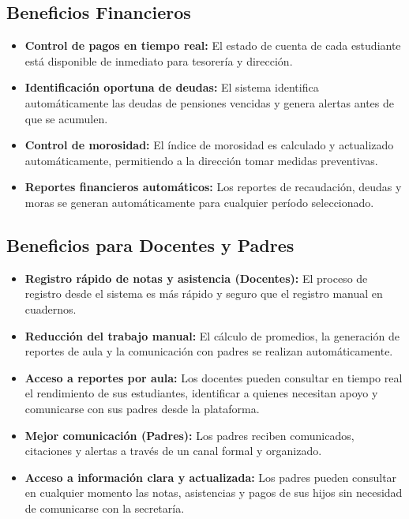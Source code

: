 \documentclass[12pt,a4paper,oneside]{report}
\begin{document}
\subsection{Beneficios Financieros}
\begin{itemize}
  \item \textbf{Control de pagos en tiempo real:} El estado de cuenta de cada estudiante está disponible de inmediato para tesorería y dirección.
  \item \textbf{Identificación oportuna de deudas:} El sistema identifica automáticamente las deudas de pensiones vencidas y genera alertas antes de que se acumulen.
  \item \textbf{Control de morosidad:} El índice de morosidad es calculado y actualizado automáticamente, permitiendo a la dirección tomar medidas preventivas.
  \item \textbf{Reportes financieros automáticos:} Los reportes de recaudación, deudas y moras se generan automáticamente para cualquier período seleccionado.
\end{itemize}

\subsection{Beneficios para Docentes y Padres}
\begin{itemize}
  \item \textbf{Registro rápido de notas y asistencia (Docentes):} El proceso de registro desde el sistema es más rápido y seguro que el registro manual en cuadernos.
  \item \textbf{Reducción del trabajo manual:} El cálculo de promedios, la generación de reportes de aula y la comunicación con padres se realizan automáticamente.
  \item \textbf{Acceso a reportes por aula:} Los docentes pueden consultar en tiempo real el rendimiento de sus estudiantes, identificar a quienes necesitan apoyo y comunicarse con sus padres desde la plataforma.
  \item \textbf{Mejor comunicación (Padres):} Los padres reciben comunicados, citaciones y alertas a través de un canal formal y organizado.
  \item \textbf{Acceso a información clara y actualizada:} Los padres pueden consultar en cualquier momento las notas, asistencias y pagos de sus hijos sin necesidad de comunicarse con la secretaría.
\end{itemize}
\end{document}
